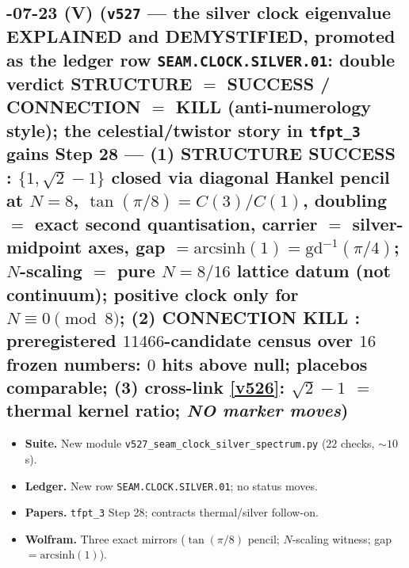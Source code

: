 \subsection*{-07-23 (V) (\texttt{v527} --- the silver clock eigenvalue EXPLAINED and DEMYSTIFIED, promoted as the ledger row \texttt{SEAM.CLOCK.SILVER.01}: double verdict STRUCTURE $=$ SUCCESS / CONNECTION $=$ KILL (anti-numerology style); the celestial/twistor story in \texttt{tfpt\_3} gains Step 28 --- (1) STRUCTURE SUCCESS \mE: $\{1,\sqrt2-1\}$ closed via diagonal Hankel pencil at $N=8$, $\tan(\pi/8)=C(3)/C(1)$, doubling $=$ exact second quantisation, carrier $=$ silver-midpoint axes, gap $=\mathrm{arcsinh}(1)=\mathrm{gd}^{-1}(\pi/4)$; $N$-scaling $=$ pure $N=8/16$ lattice datum (not continuum); positive clock only for $N\equiv0\pmod8$; (2) CONNECTION KILL \mE: preregistered $11466$-candidate census over $16$ frozen numbers: $0$ hits above null; placebos comparable; (3) cross-link \vref{v526}: $\sqrt2-1$ $=$ thermal kernel ratio; \emph{NO marker moves})}
\begin{itemize}[leftmargin=1.5em]
\item \textbf{Suite.} New module \texttt{v527\_seam\_clock\_silver\_spectrum.py} ($22$ checks, $\sim10$ s).
\item \textbf{Ledger.} New row \texttt{SEAM.CLOCK.SILVER.01}; no status moves.
\item \textbf{Papers.} \texttt{tfpt\_3} Step 28; contracts thermal/silver follow-on.
\item \textbf{Wolfram.} Three exact mirrors ($\tan(\pi/8)$ pencil; $N$-scaling witness; gap $=\mathrm{arcsinh}(1)$).
\end{itemize}

